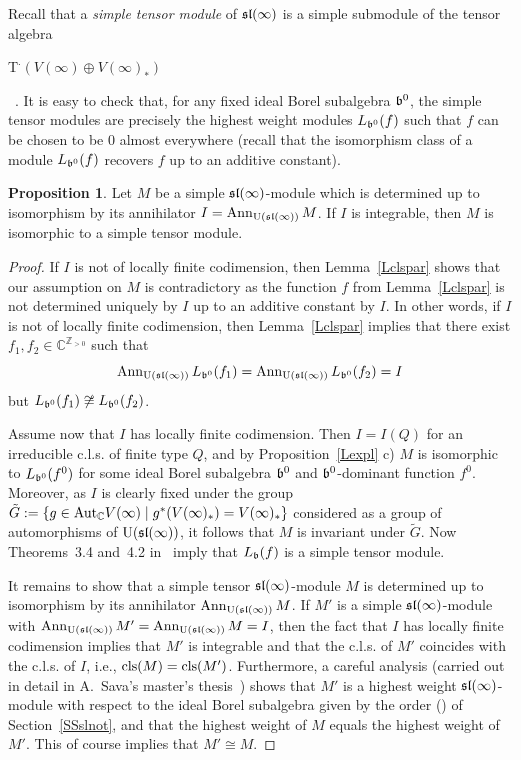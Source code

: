 \documentclass[10pt]{amsart}\oddsidemargin -1mm \evensidemargin -1mm \topmargin -15mm\headheight5mm \headsep 3.5mm \textheight 245mm\textwidth 170mm %
\theoremstyle{definition}\newtheorem{theorem}{Theorem}[section]\newtheorem{lemma}[theorem]{Lemma}\newtheorem{remark}[theorem]{Remark}\newtheorem{proposition}[theorem]{Proposition}\newtheorem{corollary}[theorem]{Corollary}\newtheorem{definition}[theorem]{Definition}\newtheorem{Ex}[theorem]{Example}
\begin{document}
Recall that a {\it simple tensor module} of $\frak{sl}(\infty)$ is a simple submodule of the tensor algebra \begin{center}T$^\cdot(V(\infty)\oplus V(\infty)_*)$\end{center}~\cite{DPS, PS}. It is easy to check that, for any fixed ideal Borel subalgebra $\frak b^0$, the simple tensor modules are precisely the highest weight modules $L_{\frak b^0}(f)$ such that $f$ can be chosen to be 0 almost everywhere (recall that the isomorphism class of a module $L_{\frak b^0}(f)$ recovers $f$ up to an additive constant).
\begin{proposition} Let $M$ be a simple $\frak{sl}(\infty)$-module which is determined up to isomorphism by its annihilator $I=\operatorname{\mathrm{Ann}}_{\operatorname{\mathrm{U}}(\frak{sl}(\infty))}M$. If $I$ is integrable, then $M$ is isomorphic to a simple tensor module.\end{proposition}
\begin{proof} %
If $I$ is not of locally finite codimension, then Lemma~\ref{Lclspar} shows that our assumption on $M$ is contradictory as the function $f$  from Lemma~\ref{Lclspar} is not determined uniquely by $I$ up to an additive constant by $I$. In other words, if $I$ is not of locally finite codimension, then Lemma~\ref{Lclspar} implies that there exist $f_1, f_2\in \mathbb C^{\mathbb Z_{>0}}$ such that $$\operatorname{\mathrm{Ann}}_{\operatorname{\mathrm{U}}(\frak{sl}(\infty))} L_{\frak b^0}(f_1)=\operatorname{\mathrm{Ann}}_{\operatorname{\mathrm{U}}(\frak{sl}(\infty))} L_{\frak b^0}(f_2)=I$$but $L_{\frak b^0}(f_1)\not\cong L_{\frak b^0}(f_2)$.

Assume now that $I$ has locally finite codimension. Then $I=I(Q)$ for an irreducible c.l.s. of finite type $Q$, and by Proposition~\ref{Lexpl} c) $M$ is isomorphic to $L_{\frak b^0}(f^0)$ for some ideal Borel subalgebra $\frak b^0$ and $\frak b^0$-dominant function $f^0$. Moreover, as $I$ is clearly fixed under the group $\tilde G:= \{g\in{\rm Aut}_\mathbb CV(\infty)\mid g^*(V(\infty)_*)=V(\infty)_*\}$ considered as a group of automorphisms of $\operatorname{\mathrm{U}}(\frak{sl}(\infty))$, it follows that $M$ is invariant under $\tilde G$. Now Theorems~3.4 and~4.2 in~\cite{DPS} imply that $L_\frak b(f)$ is a simple tensor module.

It remains to show that a simple tensor $\frak{sl}(\infty)$-module $M$ is determined up to isomorphism by its annihilator $\operatorname{\mathrm{Ann}}_{\operatorname{\mathrm{U}}(\frak{sl}(\infty))}M$. If $M'$ is a simple $\frak{sl}(\infty)$-module with $\operatorname{\mathrm{Ann}}_{\operatorname{\mathrm{U}}(\frak{sl}(\infty))}M'=\operatorname{\mathrm{Ann}}_{\operatorname{\mathrm{U}}(\frak{sl}(\infty))} M=I$, then the fact that $I$ has locally finite codimension implies that $M'$ is integrable and that the c.l.s. of $M'$ coincides with the c.l.s. of $I$, i.e., $\operatorname{\mathrm{cls}}(M)=\operatorname{\mathrm{cls}}(M')$. Furthermore, a careful analysis (carried out in detail in A.~Sava's master's thesis~\cite{Sa}) shows that $M'$ is a highest weight $\frak{sl}(\infty)$-module with respect to the ideal Borel subalgebra given by the order () of Section~\ref{SSslnot}, and that the highest weight of $M$ equals the highest weight of $M'$. This of course implies that $M'\cong M$.\end{proof}
\end{document}
